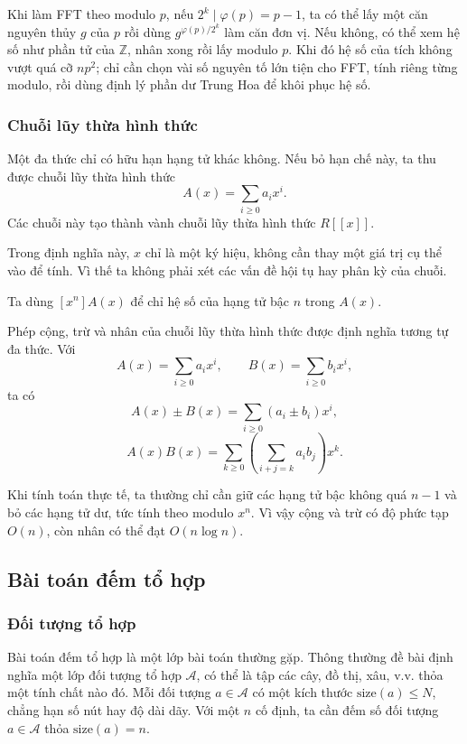 \documentclass[11pt]{article}
\begin{document}
Khi làm FFT theo modulo \(p\), nếu \(2^k\mid \varphi(p)=p-1\), ta có thể lấy
một căn nguyên thủy \(g\) của \(p\) rồi dùng \(g^{\varphi(p)/2^k}\) làm căn đơn
vị. Nếu không, có thể xem hệ số như phần tử của \(\mathbb Z\), nhân xong rồi
lấy modulo \(p\). Khi đó hệ số của tích không vượt quá cỡ \(n p^2\); chỉ cần
chọn vài số nguyên tố lớn tiện cho FFT, tính riêng từng modulo, rồi dùng định
lý phần dư Trung Hoa để khôi phục hệ số.

\subsubsection{Chuỗi lũy thừa hình thức}

Một đa thức chỉ có hữu hạn hạng tử khác không. Nếu bỏ hạn chế này, ta thu được
chuỗi lũy thừa hình thức
\[
  A(x)=\sum_{i\ge 0} a_i x^i. \tag{2.2}
\]
Các chuỗi này tạo thành vành chuỗi lũy thừa hình thức \(R[[x]]\).

Trong định nghĩa này, \(x\) chỉ là một ký hiệu, không cần thay một giá trị cụ
thể vào để tính. Vì thế ta không phải xét các vấn đề hội tụ hay phân kỳ của
chuỗi.

Ta dùng \([x^n]A(x)\) để chỉ hệ số của hạng tử bậc \(n\) trong \(A(x)\).

Phép cộng, trừ và nhân của chuỗi lũy thừa hình thức được định nghĩa tương tự
đa thức. Với
\[
  A(x)=\sum_{i\ge 0} a_i x^i,\qquad
  B(x)=\sum_{i\ge 0} b_i x^i, \tag{2.3}
\]
ta có
\[
  A(x)\pm B(x)=\sum_{i\ge 0}(a_i\pm b_i)x^i, \tag{2.4}
\]
\[
  A(x)B(x)=\sum_{k\ge 0}\left(\sum_{i+j=k}a_i b_j\right)x^k. \tag{2.5}
\]

Khi tính toán thực tế, ta thường chỉ cần giữ các hạng tử bậc không quá \(n-1\)
và bỏ các hạng tử dư, tức tính theo modulo \(x^n\). Vì vậy cộng và trừ có độ
phức tạp \(O(n)\), còn nhân có thể đạt \(O(n\log n)\).

\subsection{Bài toán đếm tổ hợp}

\subsubsection{Đối tượng tổ hợp}

Bài toán đếm tổ hợp là một lớp bài toán thường gặp. Thông thường đề bài định
nghĩa một lớp đối tượng tổ hợp \(\mathcal A\), có thể là tập các cây, đồ thị,
xâu, v.v. thỏa một tính chất nào đó. Mỗi đối tượng \(a\in\mathcal A\) có một
kích thước \(\mathrm{size}(a)\le N\), chẳng hạn số nút hay độ dài dãy. Với một
\(n\) cố định, ta cần đếm số đối tượng \(a\in\mathcal A\) thỏa
\(\mathrm{size}(a)=n\).
\end{document}
